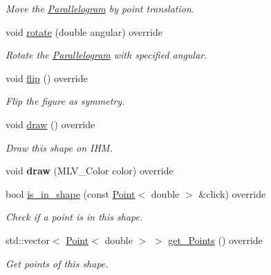 \begin{DoxyCompactItemize}
\begin{DoxyCompactList}\small\item\em Move the \hyperlink{classParallelogram}{Parallelogram} by point translation. \end{DoxyCompactList}\item 
void \hyperlink{classParallelogram_ac498f6a15dea236ecc49bece023d17b0}{rotate} (double angular) override
\begin{DoxyCompactList}\small\item\em Rotate the \hyperlink{classParallelogram}{Parallelogram} with specified angular. \end{DoxyCompactList}\item 
\mbox{\label{classParallelogram_a51f002e90b7bf6c5d875cc094c22f7c1}} 
void \hyperlink{classParallelogram_a51f002e90b7bf6c5d875cc094c22f7c1}{flip} () override
\begin{DoxyCompactList}\small\item\em Flip the figure as symmetry. \end{DoxyCompactList}\item 
\mbox{\label{classParallelogram_a73e3657bf024787b57ccdd8035a6fdef}} 
void \hyperlink{classParallelogram_a73e3657bf024787b57ccdd8035a6fdef}{draw} () override
\begin{DoxyCompactList}\small\item\em Draw this shape on I\+HM. \end{DoxyCompactList}\item 
\mbox{\label{classParallelogram_a4c819c66cd206e71a86e863e266ff356}} 
void {\bfseries draw} (M\+L\+V\+\_\+\+Color color) override
\item 
bool \hyperlink{classParallelogram_a585b14ca0f65ed3a5007e8c1df3c6bc4}{is\+\_\+in\+\_\+shape} (const \hyperlink{classPoint}{Point}$<$ double $>$ \&click) override
\begin{DoxyCompactList}\small\item\em Check if a point is in this shape. \end{DoxyCompactList}\item 
std\+::vector$<$ \hyperlink{classPoint}{Point}$<$ double $>$ $>$ \hyperlink{classParallelogram_a17c9986712806a8b07d90e444e0a543d}{get\+\_\+\+Points} () override
\begin{DoxyCompactList}\small\item\em Get points of this shape. \end{DoxyCompactList}\item 

\end{DoxyCompactItemize}
